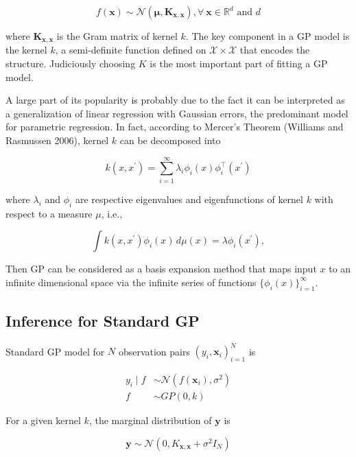 \begin{equation*}
    f(\bm x) \sim \mathcal{N}(\bm\mu, \bm K_{\bm x, \bm x}), \forall\ \bm x \in
    \mathbb{R}^{d} \text{ and } d
\end{equation*}

where \(\bm K_{\bm x, \bm x}\) is the Gram matrix of kernel \(k\). The
key component in a GP model is the kernel \(k\), a semi-definite
function defined on \(\mathcal{X}\times\mathcal{X}\) that encodes the
structure. Judiciously choosing \(K\) is the most important part of
fitting a GP model.

A large part of its popularity is probably due to the fact it can be
interpreted as a generalization of linear regression with Gaussian
errors, the predominant model for parametric regression. In fact,
according to Mercer's Theorem (Williams and Rasmussen 2006), kernel
\(k\) can be decomposed into

\begin{equation*}
k(x, x^\prime)=\sum_{i=1}^\infty\lambda_i\phi_i(x)\phi^\intercal_i(x^\prime)
\end{equation*}

\noindent where \(\lambda_i\) and \(\phi_i\) are respective eigenvalues
and eigenfunctions of kernel \(k\) with respect to a measure \(\mu\),
i.e.,

\begin{equation*}
\int k(x, x^\prime)\phi_i(x) \,d\mu(x)=\lambda\phi_i(x^\prime),
\end{equation*}

\noindent Then GP can be considered as a basis expansion method that
maps input \(x\) to an infinite dimensional space via the infinite
series of functions \(\{\phi_i(x)\}_{i=1}^\infty\).

\subsection{Inference for Standard GP}\label{inference-for-standard-gp}

Standard GP model for \(N\) observation pairs \((y_i, \bm x_i)_{i=1}^N\)
is

\begin{align*}
    y_i\mid f &\sim \mathcal{N}(f(\bm x_i), \sigma^2) \\
    f &\sim GP(0, k)
\end{align*}

For a given kernel \(k\), the marginal distribution of \(\bm y\) is

\begin{equation*}
\bm y \sim \mathcal{N}(0, K_{\bm x, \bm x}+\sigma^2I_N)
\end{equation*}

